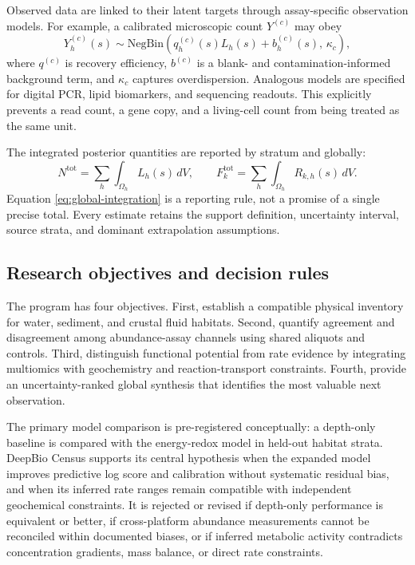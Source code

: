 \documentclass[conference]{../../../../Conference-LaTeX-template_10-17-19/IEEEtran}
\begin{document}
Observed data are linked to their latent targets through assay-specific observation models. For example, a calibrated microscopic count $Y^{(c)}$ may obey
\begin{equation}
Y^{(c)}_{h}(s) \sim \mathrm{NegBin}\!\left(q^{(c)}_{h}(s)L_h(s)+b^{(c)}_{h}(s),\,\kappa_c\right),
\label{eq:count-observation}
\end{equation}
where $q^{(c)}$ is recovery efficiency, $b^{(c)}$ is a blank- and contamination-informed background term, and $\kappa_c$ captures overdispersion. Analogous models are specified for digital PCR, lipid biomarkers, and sequencing readouts. This explicitly prevents a read count, a gene copy, and a living-cell count from being treated as the same unit.

The integrated posterior quantities are reported by stratum and globally:
\begin{equation}
N^{\mathrm{tot}}=\sum_h\int_{\Omega_h}L_h(s)\,dV,\qquad
F_k^{\mathrm{tot}}=\sum_h\int_{\Omega_h}R_{k,h}(s)\,dV.
\label{eq:global-integration}
\end{equation}
Equation \eqref{eq:global-integration} is a reporting rule, not a promise of a single precise total. Every estimate retains the support definition, uncertainty interval, source strata, and dominant extrapolation assumptions.

\subsection{Research objectives and decision rules}
The program has four objectives. First, establish a compatible physical inventory for water, sediment, and crustal fluid habitats. Second, quantify agreement and disagreement among abundance-assay channels using shared aliquots and controls. Third, distinguish functional potential from rate evidence by integrating multiomics with geochemistry and reaction-transport constraints. Fourth, provide an uncertainty-ranked global synthesis that identifies the most valuable next observation.

The primary model comparison is pre-registered conceptually: a depth-only baseline is compared with the energy-redox model in held-out habitat strata. DeepBio Census supports its central hypothesis when the expanded model improves predictive log score and calibration without systematic residual bias, and when its inferred rate ranges remain compatible with independent geochemical constraints. It is rejected or revised if depth-only performance is equivalent or better, if cross-platform abundance measurements cannot be reconciled within documented biases, or if inferred metabolic activity contradicts concentration gradients, mass balance, or direct rate constraints.
\end{document}

